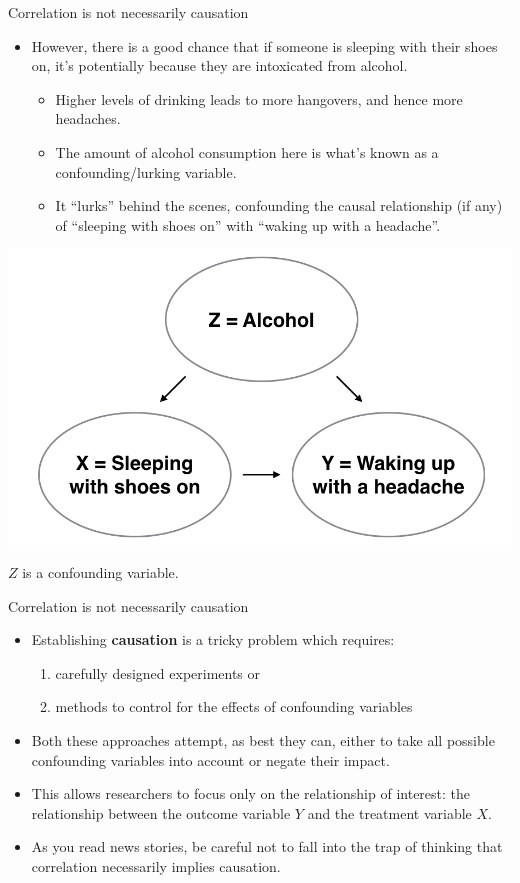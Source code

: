 \documentclass[
  ignorenonframetext,
]{beamer}
\providecommand{\tightlist}{%
  \setlength{\itemsep}{0pt}\setlength{\parskip}{0pt}}
\begin{document}
\begin{frame}{Correlation is not necessarily causation}
\protect\hypertarget{correlation-is-not-necessarily-causation-2}{}
\begin{itemize}
\item
  However, there is a good chance that if someone is sleeping with their
  shoes on, it's potentially because they are intoxicated from alcohol.

  \begin{itemize}
  \tightlist
  \item
    Higher levels of drinking leads to more hangovers, and hence more
    headaches.
  \item
    The amount of alcohol consumption here is what's known as a
    confounding/lurking variable.
  \item
    It ``lurks'' behind the scenes, confounding the causal relationship
    (if any) of ``sleeping with shoes on'' with ``waking up with a
    headache''.
  \end{itemize}
\end{itemize}

\begin{center}\includegraphics[width=0.6\linewidth,height=0.3\textheight]{week4_8} \end{center}

\(Z\) is a confounding variable.
\end{frame}

\begin{frame}{Correlation is not necessarily causation}
\protect\hypertarget{correlation-is-not-necessarily-causation-3}{}
\begin{itemize}
\item
  Establishing \textbf{causation} is a tricky problem which requires:

  \begin{enumerate}
  \tightlist
  \item
    carefully designed experiments or
  \item
    methods to control for the effects of confounding variables
  \end{enumerate}
\item
  Both these approaches attempt, as best they can, either to take all
  possible confounding variables into account or negate their impact.
\item
  This allows researchers to focus only on the relationship of interest:
  the relationship between the outcome variable \(Y\) and the treatment
  variable \(X\).
\item
  As you read news stories, be careful not to fall into the trap of
  thinking that correlation necessarily implies causation.
\end{itemize}
\end{frame}
\end{document}
